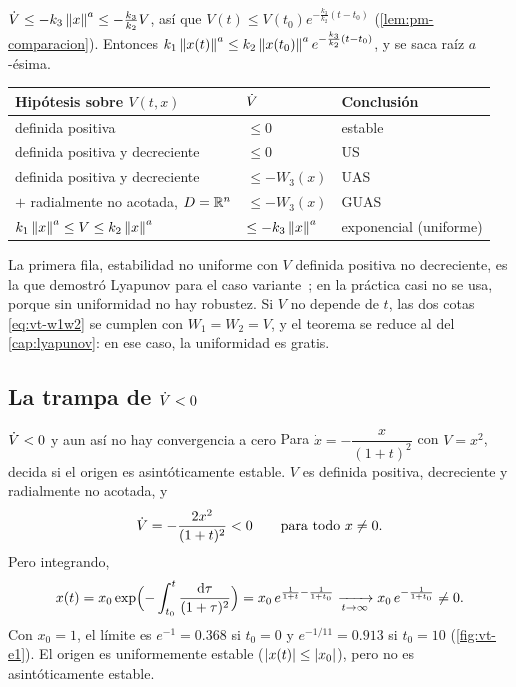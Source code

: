 \begin{demostracion}
$\dot V\le-k_3\left\lVert x\right\rVert^a\le-\frac{k_3}{k_2}V$, así que $V(t)\le V(t_0)e^{-\frac{k_3}{k_2}(t-t_0)}$ (\cref{lem:pm-comparacion}). Entonces $k_1\left\lVert x(t)\right\rVert^a\le k_2\left\lVert x(t_0)\right\rVert^ae^{-\frac{k_3}{k_2}(t-t_0)}$, y se saca raíz $a$-ésima.
\end{demostracion}

\begin{center}
\small
\begin{tabular}{@{}p{4.9cm}p{3.1cm}p{3.3cm}@{}}
\toprule
Hipótesis sobre $V(t,x)$ & $\dot V$ & Conclusión \\
\midrule
definida positiva & $\le0$ & estable \\
definida positiva y decreciente & $\le0$ & US \\
definida positiva y decreciente & $\le-W_3(x)$ & UAS \\
\quad$+$ radialmente no acotada, $D=\mathbb{R}^n$ & $\le-W_3(x)$ & GUAS \\
$k_1\left\lVert x\right\rVert^a\le V\le k_2\left\lVert x\right\rVert^a$ & $\le-k_3\left\lVert x\right\rVert^a$ & exponencial (uniforme) \\
\bottomrule
\end{tabular}
\end{center}

La primera fila, estabilidad no uniforme con $V$ definida positiva no decreciente, es la que demostró Lyapunov para el caso variante~\citep{Lya92}; en la práctica casi no se usa, porque sin uniformidad no hay robustez. Si $V$ no depende de $t$, las dos cotas \eqref{eq:vt-w1w2} se cumplen con $W_1=W_2=V$, y el teorema se reduce al del \cref{cap:lyapunov}: en ese caso, la uniformidad es gratis.

\subsection{La trampa de $\dot V<0$}

\begin{ejemplo}[label=ej:vt-e1]{$\dot V<0$ y aun así no hay convergencia a cero}
Para $\dot x=-\dfrac{x}{(1+t)^2}$ con $V=x^2$, decida si el origen es asintóticamente estable.
\solucion $V$ es definida positiva, decreciente y radialmente no acotada, y
\[
  \dot V=-\frac{2x^2}{(1+t)^2}<0\qquad\text{para todo }x\neq0 .
\]
Pero integrando,
\[
  x(t)=x_0\exp\Bigl(-\int_{t_0}^t\frac{\mathrm{d}\tau}{(1+\tau)^2}\Bigr)=x_0\,e^{\frac1{1+t}-\frac1{1+t_0}}\xrightarrow[t\to\infty]{}x_0\,e^{-\frac1{1+t_0}}\neq0 .
\]
Con $x_0=1$, el límite es $e^{-1}=0.368$ si $t_0=0$ y $e^{-1/11}=0.913$ si $t_0=10$ (\cref{fig:vt-e1}). El origen es uniformemente estable ($\left\lvert x(t)\right\rvert\le\left\lvert x_0\right\rvert$), pero no es asintóticamente estable.
\end{ejemplo}

